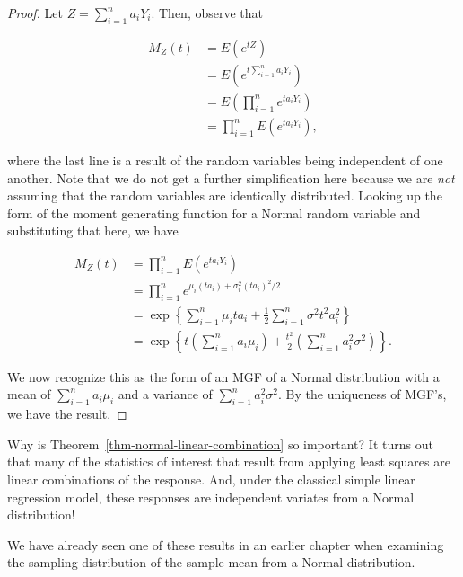 \documentclass[
  letterpaper,
  DIV=11,
  numbers=noendperiod]{scrreprt}
\theoremstyle{definition}
\theoremstyle{definition}
\theoremstyle{plain}
\theoremstyle{remark}
\begin{document}
\begin{proof}

Let \(Z = \sum_{i=1}^{n} a_i Y_i\). Then, observe that

\[
\begin{aligned}
  M_Z(t) 
    &= E\left(e^{tZ}\right) \\
    &= E\left(e^{t \sum_{i=1}^{n} a_i Y_i}\right) \\
    &= E\left(\prod_{i=1}^{n} e^{ta_i Y_i}\right) \\
    &= \prod_{i=1}^{n} E\left(e^{t a_i Y_i}\right),
\end{aligned}
\]

where the last line is a result of the random variables being
independent of one another. Note that we do not get a further
simplification here because we are \emph{not} assuming that the random
variables are identically distributed. Looking up the form of the moment
generating function for a Normal random variable and substituting that
here, we have

\[
\begin{aligned}
  M_Z(t) 
    &= \prod_{i=1}^{n} E\left(e^{t a_i Y_i}\right) \\
    &= \prod_{i=1}^{n} e^{\mu_i \left(t a_i\right) + \sigma_i^2 \left(t a_i\right)^2 / 2} \\
    &= \exp\left\{\sum_{i=1}^{n} \mu_i t a_i + \frac{1}{2} \sum_{i=1}^{n} \sigma^2 t^2 a_i^2\right\} \\
    &= \exp\left\{t \left(\sum_{i=1}^{n} a_i \mu_i\right) + \frac{t^2}{2} \left(\sum_{i=1}^{n} a_i^2 \sigma^2\right)\right\}.
\end{aligned}
\]

We now recognize this as the form of an MGF of a Normal distribution
with a mean of \(\sum_{i=1}^{n} a_i \mu_i\) and a variance of
\(\sum_{i=1}^{n} a_i^2 \sigma^2\). By the uniqueness of MGF's, we have
the result.

\end{proof}

Why is Theorem~\ref{thm-normal-linear-combination} so important? It
turns out that many of the statistics of interest that result from
applying least squares are linear combinations of the response. And,
under the classical simple linear regression model, these responses are
independent variates from a Normal distribution!

We have already seen one of these results in an earlier chapter when
examining the sampling distribution of the sample mean from a Normal
distribution.
\end{document}
